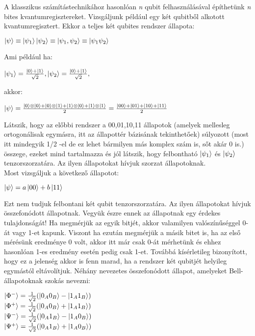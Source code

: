 A klasszikus számítástechnikához hasonlóan \textit{n} qubit felhasználásával építhetünk \textit{n} bites kvantumregisztereket. Vizsgáljunk például egy két qubitből alkotott kvantumregisztert. Ekkor a teljes két qubites rendszer állapota:
\begin{center}
$ \ket{\psi} \equiv \ket{\psi_1}\ket{\psi_2} \equiv \ket{\psi_1,\psi_2} \equiv \ket{\psi_1\psi_2} $
\end{center}
Ami például ha:
\begin{center}
$ \ket{\psi_1} = \frac{\ket{0}+\ket{1}}{\sqrt{2}}, \ket{\psi_2}=\frac{\ket{0}+\ket{1}}{\sqrt{2}}, $
\end{center}
akkor:
\begin{center}
$ \ket{\psi}= \frac{\ket{0} \otimes \ket{0} +\ket{0}\otimes\ket{1}+\ket{1}\otimes\ket{0}+\ket{1}\otimes\ket{1}  }{2} = \frac{\ket{00}+\ket{01}+\ket{10}+\ket{11}}{2} $
\end{center}
Látszik, hogy az előbbi rendszer a 00,01,10,11 állapotok (amelyek mellesleg ortogonálisak egymásra, itt az állapottér bázisának tekinthetőek) súlyozott (most itt mindegyik 1/2 -el de ez lehet bármilyen más komplex szám is, sőt akár 0 is.) összege, ezeket mind tartalmazza és jól látszik, hogy felbontható $\ket{\psi_1}$  és  $\ket{\psi_2}$  tenzorszorzatára. Az ilyen állapotokat hívjuk szorzat állapotoknak.\\
Most vizsgáljuk a következő állapotot:
\begin{center}
$ \ket{\psi} = a\ket{00}+b\ket{11} $
\end{center}
Ezt nem tudjuk felbontani két qubit tenzorszorzatára. Az ilyen állapotokat hívjuk összefonódott állapotnak. Vegyük észre ennek az állapotnak egy érdekes tulajdonságát! Ha megmérjük az egyik bitjét, akkor valamilyen valószínűséggel 0-át vagy 1-et kapunk. Viszont ha ezután megmérjük a másik bitet is, ha az első mérésünk eredménye 0 volt, akkor itt már csak 0-át mérhetünk és ehhez hasonlóan 1-es eredmény esetén pedig csak 1-et. Továbbá kísérletileg bizonyított, hogy ez a jelenség akkor is fenn marad, ha a rendszer két qubitjét helyileg egymástól eltávolítjuk.
Néhány nevezetes összefonódott állapot, amelyeket Bell-állapotoknak szokás nevezni:
\begin{center}
$ \ket{\Phi^-}= \frac{1}{\sqrt{2}}(\ket{0_A0_B}-\ket{1_A1_B}) $ \\
$ \ket{\Phi^+}= \frac{1}{\sqrt{2}}(\ket{0_A0_B}+\ket{1_A1_B}) $ \\
$ \ket{\Psi^-}= \frac{1}{\sqrt{2}}(\ket{0_A1_B}-\ket{1_A0_B}) $ \\
$ \ket{\Psi^+}= \frac{1}{\sqrt{2}}(\ket{0_A1_B}+\ket{1_A0_B}) $ \\

\end{center}

